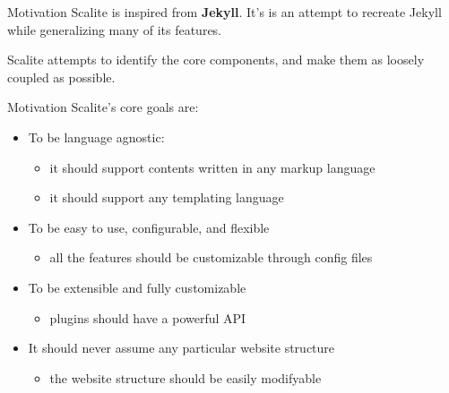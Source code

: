 \documentclass[compress, aspectratio=169]{beamer}
\begin{document}
\begin{frame}{Motivation}
    Scalite is inspired from \textbf{Jekyll}. It's is an attempt to recreate Jekyll
    while generalizing many of its features. 

    Scalite attempts to identify the core components, and make them as loosely
    coupled as possible. 
\end{frame}

\begin{frame}{Motivation}
    Scalite's core goals are:
    \begin{itemize}[<+->]
        \item To be language agnostic:
            \begin{itemize}
                \item it should support contents written in any markup language
                \item it should support any templating language
            \end{itemize}
        \item To be easy to use, configurable, and flexible
            \begin{itemize}
                \item all the features should be customizable through config files
            \end{itemize}
        \item To be extensible and fully customizable
            \begin{itemize}
                \item plugins should have a powerful API
            \end{itemize}
        \item It should never assume any particular website structure
            \begin{itemize}
                \item the website structure should be easily modifyable
            \end{itemize}
    \end{itemize}
\end{frame}
\end{document}
